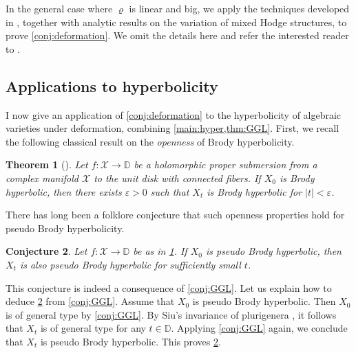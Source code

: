 \documentclass[english]{amsproc}
\theoremstyle{plain}
\newtheorem{thm}{Theorem}[section]
\newtheorem{conjecture}[thm]{Conjecture}
\theoremstyle{definition}
\theoremstyle{remark}
\theoremstyle{plain}
\numberwithin{equation}{thm} %
\def\ep{\varepsilon}
\newcommand{\sX}{\mathscr{X}}
\newcommand{\bD}{\mathbb{D}}
\begin{document}
 	In the general case where $\varrho$ is linear and big, we apply the techniques
 	developed in \cite{EKPR12}, together with analytic results on the variation of
 	mixed Hodge structures, to prove \cref{conj:deformation}. We omit the details
 	here and refer the interested reader to \cite{DMW24}. 
 	 
 	\subsection{Applications to hyperbolicity}
I now give an application of \cref{conj:deformation} to the hyperbolicity of
algebraic varieties under deformation, combining
\cref{main:hyper,thm:GGL}. 
First, we recall the following classical result on the \emph{openness}
of Brody hyperbolicity. 
 	\begin{thm}[{\cite[Proposition 1.10]{Dem20}}]\label{thm:Brody}
 		Let $f:\sX\to \bD$ be a  holomorphic proper submersion from a complex manifold $\sX$ to  the unit disk with connected fibers.  If $X_0$ is  Brody hyperbolic, then there exists $\ep>0$ such that $X_t$ is Brody hyperbolic   for  $|t|<\ep$. 
 	\end{thm}
 	There has long been a folklore conjecture that such openness properties hold for pseudo Brody hyperbolicity.
 	\begin{conjecture}\label{conj:hyperbolic}
 		Let $f:\sX\to \bD$ be as in \cref{thm:Brody}. If $X_0$ is pseudo Brody   hyperbolic, then  $X_t$ is also pseudo  Brody hyperbolic for   sufficiently small $t$. 
 	\end{conjecture}
 This conjecture is indeed a consequence of \cref{conj:GGL}.
 Let us explain how to deduce \cref{conj:hyperbolic} from \cref{conj:GGL}. 
 Assume that $X_0$ is pseudo Brody hyperbolic.
 Then $X_0$ is of general type by \cref{conj:GGL}.
 By Siu’s invariance of plurigenera \cite{Siu98,Pau07}, it follows that
 $X_t$ is of general type for any $t \in \bD$.
 Applying \cref{conj:GGL} again, we conclude that $X_t$ is pseudo Brody
 hyperbolic.
 This proves \cref{conj:hyperbolic}.
 
\end{document}
